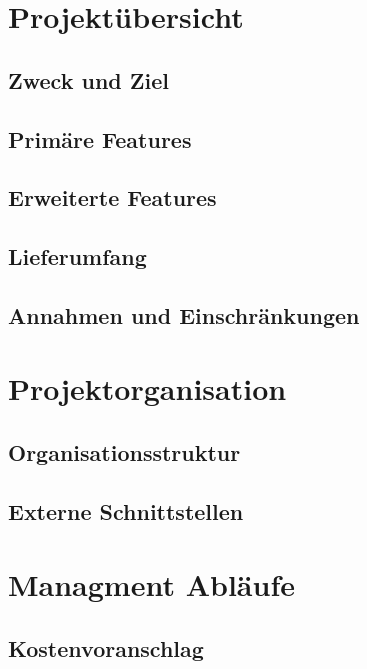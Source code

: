 \documentclass[11pt]{scrartcl}
\begin{document}
\section{Projektübersicht}


\subsection{Zweck und Ziel}
 

\subsection{Primäre Features}

\subsection{Erweiterte Features}


\subsection{Lieferumfang}


\subsection{Annahmen und Einschränkungen}

\section{Projektorganisation}

\subsection{Organisationsstruktur}


\subsection{Externe Schnittstellen}



\section{Managment Abläufe}

\subsection{Kostenvoranschlag}
\end{document}
